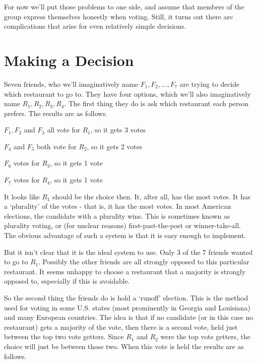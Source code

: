 For now we'll put those problems to one side, and assume that members of the group express themselves honestly when voting. Still, it turns out there are complications that arise for even relatively simple decisions.

\section{Making a Decision}
Seven friends, who we'll imaginatively name $F_1, F_2, ..., F_7$ are trying to decide which restaurant to go to. They have four options, which we'll also imaginatively name $R_1, R_2, R_3, R_4$. The first thing they do is ask which restaurant each person prefers. The results are as follows.

\begin{itemize*}
\item $F_1, F_2$ and $F_3$ all vote for $R_1$, so it gets 3 votes
\item $F_4$ and $F_5$ both vote for $R_2$, so it gets 2 votes
\item $F_6$ votes for $R_3$, so it gets 1 vote
\item $F_7$ votes for $R_4$, so it gets 1 vote
\end{itemize*}

It looks like $R_1$ should be the choice then. It, after all, has the most votes. It has a `plurality' of the votes - that is, it has the most votes. In most American elections, the candidate with a plurality wins. This is sometimes known as plurality voting, or (for unclear reasons) first-past-the-post or winner-take-all. The obvious advantage of such a system is that it is easy enough to implement.

But it isn't clear that it is the ideal system to use. Only 3 of the 7 friends wanted to go to $R_1$. Possibly the other friends are all strongly opposed to this particular restaurant. It seems unhappy to choose a restaurant that a majority is strongly opposed to, especially if this is avoidable.

So the second thing the friends do is hold a `runoff' election. This is the method used for voting in some U.S. states (most prominently in Georgia and Louisiana) and many European countries. The idea is that if no candidate (or in this case no restaurant) gets a majority of the vote, then there is a second vote, held just between the top two vote getters. Since $R_1$ and $R_2$ were the top vote getters, the choice will just be between those two. When this vote is held the results are as follows.

